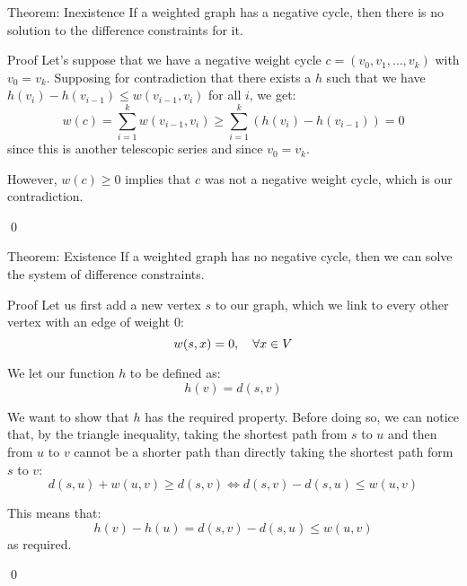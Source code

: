 \documentclass[a4paper]{article}
\begin{document}
\begin{parag}{Theorem: Inexistence}
    If a weighted graph has a negative cycle, then there is no solution to the difference constraints for it.

    \begin{subparag}{Proof}
        Let's suppose that we have a negative weight cycle $c = \left(v_0, v_1, \ldots, v_k\right)$ with $v_0 = v_k$. Supposing for contradiction that there exists a $h$ such that we have $h\left(v_i\right) - h\left(v_{i-1}\right) \leq w\left(v_{i-1}, v_{i}\right)$ for all $i$, we get: 
        \[w\left(c\right) = \sum_{i=1}^{k} w\left(v_{i-1}, v_i\right) \geq \sum_{i=1}^{k} \left(h\left(v_i\right) - h\left(v_{i-1}\right)\right) = 0\]
        since this is another telescopic series and since $v_0 = v_k$.

        However, $w\left(c\right) \geq 0$ implies that $c$ was not a negative weight cycle, which is our contradiction.

        \qed
    \end{subparag}
\end{parag}

\begin{parag}{Theorem: Existence}
    If a weighted graph has no negative cycle, then we can solve the system of difference constraints.

    \begin{subparag}{Proof}
        Let us first add a new vertex $s$ to our graph, which we link to every other vertex with an edge of weight 0: 
        \[w\left(s, x\right) = 0, \mathspace \forall x \in V\]
        
        We let our function $h$ to be defined as:
        \[h\left(v\right) = d\left(s, v\right)\]

        We want to show that $h$ has the required property. Before doing so, we can notice that, by the triangle inequality, taking the shortest path from $s$ to $u$ and then from $u$ to $v$ cannot be a shorter path than directly taking the shortest path form $s$ to $v$: 
        \[d\left(s, u\right) + w\left(u, v\right) \geq d\left(s, v\right) \iff d\left(s, v\right) - d\left(s, u\right) \leq w\left(u, v\right)\]
        
        This means that:
        \[h\left(v\right) - h\left(u\right) = d\left(s, v\right) - d\left(s, u\right) \leq  w\left(u, v\right)\]
        as required.

        \qed
    \end{subparag}
\end{parag}
\end{document}

